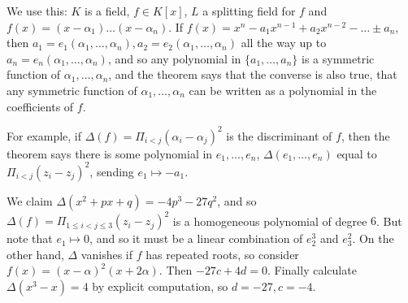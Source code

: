 \documentclass[10pt,a4paper]{article}
\begin{document}
We use this: $K$ is a field, $f \in K[x]$, $L$ a splitting field for $f$ and $f(x) = (x-\alpha_1)\ldots(x-\alpha_n)$. If $f(x) = x^n - a_1x^{n-1} +a_2x^{n-2} - \ldots \pm a_n$, then $a_1 = e_1(\alpha_1, \ldots, \alpha_n), a_2 = e_2(\alpha_1, \ldots, \alpha_n)$ all the way up to $a_n = e_n(\alpha_1, \ldots, \alpha_n)$, and so any polynomial in $\{a_1, \ldots, a_n\}$ is a symmetric function of $\alpha_1, \ldots, \alpha_n$, and the theorem says that the converse is also true, that any symmetric function of $\alpha_1, \ldots, \alpha_n$ can be written as a polynomial in the coefficients of $f$.

For example, if $\Delta(f) = \Pi_{i<j} (\alpha_i-\alpha_j)^2$ is the discriminant of $f$, then the theorem says there is some polynomial in $e_1, \ldots, e_n$, $\Delta(e_1, \ldots, e_n)$ equal to $\Pi_{i<j} (z_i - z_j)^2$, sending $e_1 \mapsto -a_1$.

We claim $\Delta(x^2+px+q) = -4p^3 - 27q^2$, and so $\Delta(f) = \Pi_{1\leq i<j\leq 3} (z_i-z_j)^2$ is a homogeneous polynomial of degree $6$. But note that $e_1 \mapsto 0$, and so it must be a linear combination of $e_2^3$ and $e_3^2$. On the other hand, $\Delta$ vanishes if $f$ has repeated roots, so consider $f(x) = (x-\alpha)^2(x+2\alpha)$. Then $-27c+4d = 0$. Finally calculate $\Delta(x^3-x) = 4$ by explicit computation, so $d = -27, c = -4.$
\end{document}
